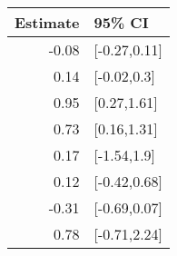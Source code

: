 \begin{tabular}{rl}
  \hline
Estimate & 95\% CI \\ 
  \hline
-0.08 & [-0.27,0.11] \\ 
  0.14 & [-0.02,0.3] \\ 
  0.95 & [0.27,1.61] \\ 
  0.73 & [0.16,1.31] \\ 
  0.17 & [-1.54,1.9] \\ 
  0.12 & [-0.42,0.68] \\ 
  -0.31 & [-0.69,0.07] \\ 
  0.78 & [-0.71,2.24] \\ 
   \hline
\end{tabular}

